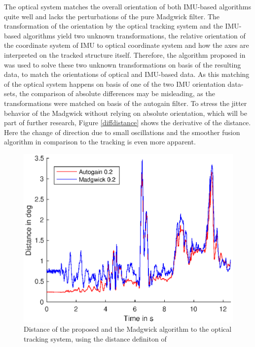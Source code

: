 \documentclass[letterpaper, 10 pt, conference]{ieeeconf}  %
\begin{document}
The optical system matches the overall orientation of both IMU-based algorithms quite well and lacks the perturbations of the pure Madgwick filter.
The transformation of the orientation by the optical tracking system and the IMU-based algorithms yield two unknown transformations, the relative orientation of the coordinate system of IMU to optical coordinate system and how the axes are interpreted on the tracked structure itself.
Therefore, the algorithm proposed in \cite{dornaika1998calibration} was used to solve these two unknown transformations on basis of the resulting data, to match the orientations of optical and IMU-based data.
As this matching of the optical system happens on basis of one of the two IMU orientation data-sets, the comparison of absolute differences may be misleading, as the transformations were matched on basis of the autogain filter. 
To stress the jitter behavior of the Madgwick without relying on absolute orientation, which will be part of further research, Figure \ref{diffdistance} shows the derivative of the distance.
Here the change of direction due to small oscillations and the smoother fusion algorithm in comparison to the tracking is even more apparent.


\begin{figure}
\includegraphics[width=\linewidth]{./graphics/distance.eps}
\caption{Distance of the proposed and the Madgwick algorithm to the optical tracking system, using the distance definiton of \cite{kuffner2004effectiveDistance}}
\label{distance}
\end{figure}
\end{document}
